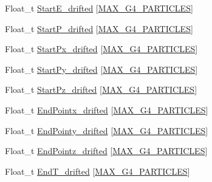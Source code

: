 \begin{DoxyCompactItemize}
\item 
Float\-\_\-t \hyperlink{classanatree_a3336eb8232966f8e21de7f4e99e910ec}{Start\-E\-\_\-drifted} \mbox{[}\hyperlink{anatree__core__v09410002_8h_aa5cbba5cc53c011e88805f38503de894}{M\-A\-X\-\_\-\-G4\-\_\-\-P\-A\-R\-T\-I\-C\-L\-E\-S}\mbox{]}
\item 
Float\-\_\-t \hyperlink{classanatree_a95e77cfd37a96804f7d6622ed4405014}{Start\-P\-\_\-drifted} \mbox{[}\hyperlink{anatree__core__v09410002_8h_aa5cbba5cc53c011e88805f38503de894}{M\-A\-X\-\_\-\-G4\-\_\-\-P\-A\-R\-T\-I\-C\-L\-E\-S}\mbox{]}
\item 
Float\-\_\-t \hyperlink{classanatree_aa7bb55560acb91e78a207e03ff517031}{Start\-Px\-\_\-drifted} \mbox{[}\hyperlink{anatree__core__v09410002_8h_aa5cbba5cc53c011e88805f38503de894}{M\-A\-X\-\_\-\-G4\-\_\-\-P\-A\-R\-T\-I\-C\-L\-E\-S}\mbox{]}
\item 
Float\-\_\-t \hyperlink{classanatree_ae98044c9b034d639ad6b8719779d0d01}{Start\-Py\-\_\-drifted} \mbox{[}\hyperlink{anatree__core__v09410002_8h_aa5cbba5cc53c011e88805f38503de894}{M\-A\-X\-\_\-\-G4\-\_\-\-P\-A\-R\-T\-I\-C\-L\-E\-S}\mbox{]}
\item 
Float\-\_\-t \hyperlink{classanatree_ad1ca1198cef0185db648581298be8d18}{Start\-Pz\-\_\-drifted} \mbox{[}\hyperlink{anatree__core__v09410002_8h_aa5cbba5cc53c011e88805f38503de894}{M\-A\-X\-\_\-\-G4\-\_\-\-P\-A\-R\-T\-I\-C\-L\-E\-S}\mbox{]}
\item 
Float\-\_\-t \hyperlink{classanatree_a9615bb4900d6867be708a7400b2230ab}{End\-Pointx\-\_\-drifted} \mbox{[}\hyperlink{anatree__core__v09410002_8h_aa5cbba5cc53c011e88805f38503de894}{M\-A\-X\-\_\-\-G4\-\_\-\-P\-A\-R\-T\-I\-C\-L\-E\-S}\mbox{]}
\item 
Float\-\_\-t \hyperlink{classanatree_ac7e3593a03b5af3c4df44d88a6794460}{End\-Pointy\-\_\-drifted} \mbox{[}\hyperlink{anatree__core__v09410002_8h_aa5cbba5cc53c011e88805f38503de894}{M\-A\-X\-\_\-\-G4\-\_\-\-P\-A\-R\-T\-I\-C\-L\-E\-S}\mbox{]}
\item 
Float\-\_\-t \hyperlink{classanatree_a217fa18cd35d47b127a0f3a64f4345b2}{End\-Pointz\-\_\-drifted} \mbox{[}\hyperlink{anatree__core__v09410002_8h_aa5cbba5cc53c011e88805f38503de894}{M\-A\-X\-\_\-\-G4\-\_\-\-P\-A\-R\-T\-I\-C\-L\-E\-S}\mbox{]}
\item 
Float\-\_\-t \hyperlink{classanatree_ae38a505b83f0ea010a495284a49a2ae3}{End\-T\-\_\-drifted} \mbox{[}\hyperlink{anatree__core__v09410002_8h_aa5cbba5cc53c011e88805f38503de894}{M\-A\-X\-\_\-\-G4\-\_\-\-P\-A\-R\-T\-I\-C\-L\-E\-S}\mbox{]}
\item 

\end{DoxyCompactItemize}
